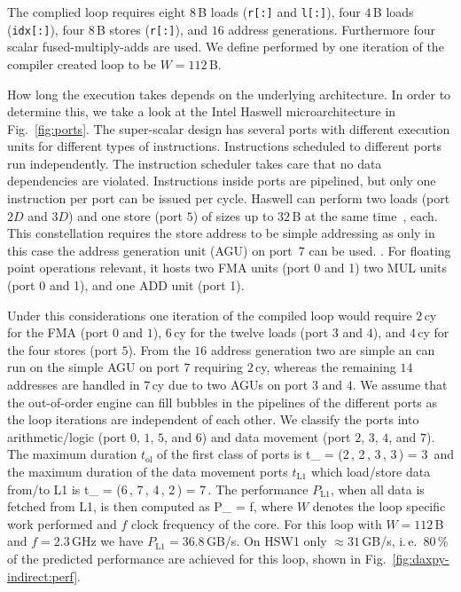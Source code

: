 {The complied loop requires eight $8$\,B loads (\verb|r[:]| and
\verb|l[:]|), four $4$\,B loads (\verb'idx[:]'), four
$8$\,B stores (\verb'r[:]'), and $16$ address generations.
Furthermore four scalar fused-multiply-adds are used. 
We define performed by one iteration of the compiler created loop to be $W =
112$\,B.

How long the execution takes depends on the underlying architecture. 
In order to determine this, we take a look at the Intel Haswell
microarchitecture in Fig.~\ref{fig:ports}.
The super-scalar design has several ports with different execution units for
different types of instructions.
Instructions scheduled to different ports run independently.
The instruction scheduler takes care that no data dependencies are violated.
Instructions inside ports are pipelined, but only one instruction per port can
be issued per cycle.
Haswell can perform two loads (port $2D$ and $3D$) and one store (port $5$) of
sizes up to $32$\,B at the same time~\cite{agner-2016-11-3}, each.
This constellation requires the store address to be simple addressing as only in
this case the address generation unit (AGU) on port~$7$ can be used.
. 
%
For floating point operations relevant, it hosts two FMA units (port 0 and
1) two MUL units (port 0 and 1), and one ADD unit (port 1).

Under this considerations one iteration of the compiled loop would require $2$\,cy
for the FMA (port $0$ and $1$), $6$\,cy for the twelve loads (port $3$ and $4$),
and $4$\,cy for the four stores (port $5$).
From the $16$ address generation two are simple an can run on the simple AGU on
port $7$ requiring $2$\,cy, whereas the remaining $14$ addresses are handled in
$7$\,cy due to two AGUs on port $3$ and $4$.
We assume that the out-of-order engine can fill bubbles in the pipelines of the
different ports as the loop iterations are independent of each other.
We classify the ports into arithmetic/logic (port $0$, $1$, $5$, and $6$) and
data movement (port $2$, $3$, $4$, and $7$). 
The maximum duration $t_\text{ol}$ of the first class of ports is 
%
\be
  t_ = \max(2\,\cyw, 2\,\cyw, 3\,\cyw, 3\,\cyw)
= 3\,\cyw
\ee
%
and the maximum duration of the data movement ports $t_\text{L1}$ which
load/store data from/to L1 is
\be
  t_ = \max(6\,\cyw, 7\,\cyw, 4\,\cyw, 2\,\cyw) =
7\,\cyw.
\ee
%
%
The performance $P_\text{L1}$, when all data is fetched from L1, is then computed as 
%
\be
  P_ =  f,
\ee
%
where $W$ denotes the loop specific work performed and $f$ clock frequency of the core.
For this loop with $W=112$\,B and $f=2.3$\,GHz we have $P_\text{L1} =
36.8$\,GB/s. On HSW1 only $\approx 31$\,GB/s, i.\,e.\ 80\,\% of the predicted
performance are achieved for this loop, shown in Fig.~\ref{fig:daxpy-indirect:perf}.

}
